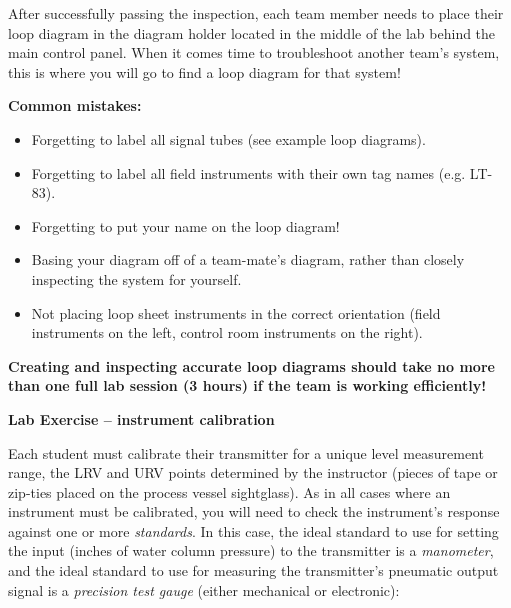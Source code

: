 After successfully passing the inspection, each team member needs to place their loop diagram in the diagram holder located in the middle of the lab behind the main control panel.  When it comes time to troubleshoot another team's system, this is where you will go to find a loop diagram for that system!

\vskip 10pt

{\bf Common mistakes:}

\begin{itemize}
\item{} Forgetting to label all signal tubes (see example loop diagrams).
\item{} Forgetting to label all field instruments with their own tag names (e.g. LT-83).
\item{} Forgetting to put your name on the loop diagram!
\item{} Basing your diagram off of a team-mate's diagram, rather than closely inspecting the system for yourself.
\item{} Not placing loop sheet instruments in the correct orientation (field instruments on the left, control room instruments on the right).
\end{itemize}

\vskip 10pt

{\bf Creating and inspecting accurate loop diagrams should take no more than one full lab session (3 hours) if the team is working efficiently!}





\vfil \eject

\noindent
{\bf Lab Exercise -- instrument calibration}

\vskip 5pt

Each student must calibrate their transmitter for a unique level measurement range, the LRV and URV points determined by the instructor (pieces of tape or zip-ties placed on the process vessel sightglass).  As in all cases where an instrument must be calibrated, you will need to check the instrument's response against one or more {\it standards}.  In this case, the ideal standard to use for setting the input (inches of water column pressure) to the transmitter is a {\it manometer}, and the ideal standard to use for measuring the transmitter's pneumatic output signal is a {\it precision test gauge} (either mechanical or electronic):

